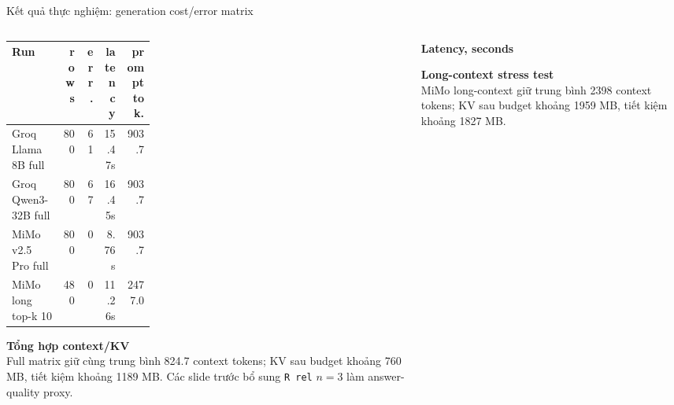 \documentclass[aspectratio=169,10pt]{beamer}
\newcommand{\smallcode}[1]{\texttt{\scriptsize #1}}
\newcommand{\minihead}[1]{{\bfseries\color{AccentDark}#1}}
\begin{document}
\begin{frame}{Kết quả thực nghiệm: generation cost/error matrix}
  \begin{columns}[T,onlytextwidth]
    \begin{column}{0.57\textwidth}
      \scriptsize
      \setlength{\tabcolsep}{2.8pt}
      \renewcommand{\arraystretch}{1.12}
      \begin{tabular}{>{\raggedright\arraybackslash}p{0.36\linewidth}r r r r}
        \toprule
        Run & rows & err. & latency & prompt tok. \\
        \midrule
        Groq Llama 8B full & 800 & 61 & 15.47s & 903.7 \\
        Groq Qwen3-32B full & 800 & 67 & 16.45s & 903.7 \\
        MiMo v2.5 Pro full & 800 & 0 & 8.76s & 903.7 \\
        MiMo long top-k 10 & 480 & 0 & 11.26s & 2477.0 \\
        \bottomrule
      \end{tabular}\par
      \vspace{0.30cm}
      \minihead{Tổng hợp context/KV}\\
      \footnotesize Full matrix giữ cùng trung bình 824.7 context tokens; KV sau budget khoảng 760 MB, tiết kiệm khoảng 1189 MB. Các slide trước bổ sung \smallcode{R rel} \(n=3\) làm answer-quality proxy.
    \end{column}
    \begin{column}{0.38\textwidth}
      \minihead{Latency, seconds}\\[-0.12cm]
      \par
      \vspace{0.18cm}
      \minihead{Long-context stress test}\\
      \footnotesize MiMo long-context giữ trung bình 2398 context tokens; KV sau budget khoảng 1959 MB, tiết kiệm khoảng 1827 MB.
    \end{column}
  \end{columns}
\end{frame}
\end{document}
